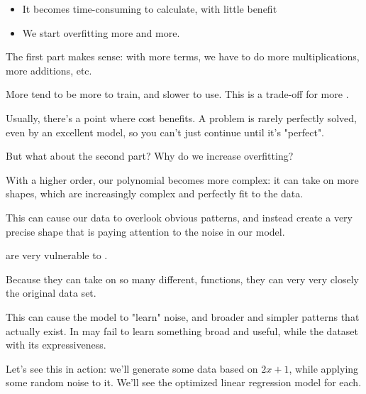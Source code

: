                 \begin{itemize}
                    \item It becomes time-consuming to calculate, with little benefit
                    \item We start overfitting more and more.
                \end{itemize}

                The first part makes sense: with more terms, we have to do more multiplications, more additions, etc.\\
                
                \begin{concept}
                    More  tend to be more  to train, and slower to use. This is a trade-off for more . 
                    
                    Usually, there's a point where cost  benefits. A problem is rarely perfectly solved, even by an excellent model, so you can't just continue until it's "perfect".
                \end{concept}

                But what about the second part? Why do we increase overfitting? 

                With a higher order, our polynomial becomes more complex: it can take on more shapes, which are increasingly complex and perfectly fit to the data.

                This can cause our data to overlook obvious patterns, and instead create a very precise shape that is paying attention to the noise in our model.\\

                \begin{concept}
                     are very vulnerable to .

                    Because they can take on so many different,  functions, they can very very closely  the original data set. 
                    
                    This can cause the model to "learn" noise, and  broader and simpler patterns that actually exist. In may fail to learn something broad and useful, while  the dataset with its expressiveness.
                \end{concept}

                Let's see this in action: we'll generate some data based on $2x+1$, while applying some random noise to it. We'll see the optimized linear regression model for each.

